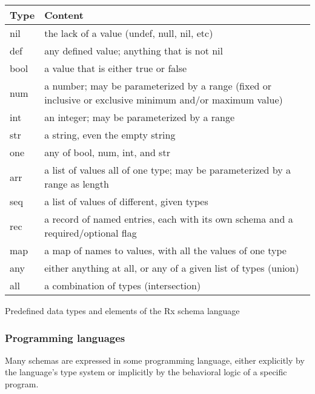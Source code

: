\begin{example}
\begin{tabularx}{\textwidth}{|l|X|}
\hline
\textbf{Type} & \textbf{Content} \\
\hline
nil  & the lack of a value (undef, null, nil, etc) \\
\hline
def  & any defined value; anything that is not nil \\
\hline
bool & a value that is either true or false \\
\hline
num  & a number; may be parameterized by a range (fixed or inclusive or exclusive minimum and/or maximum value) \\
\hline
int  & an integer; may be parameterized by a range \\
\hline
str  & a string, even the empty string \\
\hline
one  & any of bool, num, int, and str \\
\hline
arr  & a list of values all of one type; may be parameterized by a range as length \\
\hline
seq  & a list of values of different, given types \\ %
\hline
rec  & a record of named entries, each with its own schema and a required/optional flag \\
\hline
map  & a map of names to values, with all the values of one type \\
\hline
any  & either anything at all, or any of a given list of types (union) \\
\hline
all  & a combination of types (intersection) \\
\hline
\end{tabularx}
\caption{Predefined data types and elements of the Rx schema language}
\label{ex:rxtypes}
\end{example}


\subsubsection{Programming languages}

Many schemas are expressed in some
programming language, either explicitly by the language's type system or
implicitly by the behavioral logic of a specific program.

